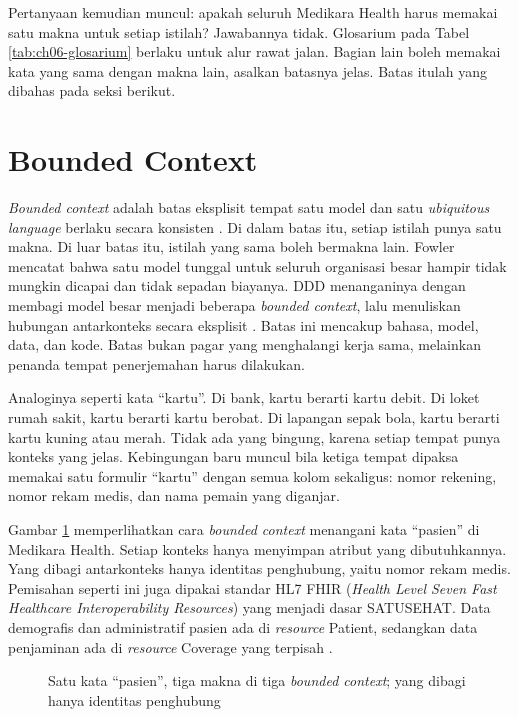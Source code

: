 Pertanyaan kemudian muncul: apakah seluruh Medikara Health harus memakai satu makna untuk setiap
istilah? Jawabannya tidak. Glosarium pada Tabel \ref{tab:ch06-glosarium} berlaku untuk alur rawat
jalan. Bagian lain boleh memakai kata yang sama dengan makna lain, asalkan batasnya jelas. Batas
itulah yang dibahas pada seksi berikut.

\section{Bounded Context}
\label{sec:ch06-bounded-context}

\textit{Bounded context} adalah batas eksplisit tempat satu model dan satu \textit{ubiquitous
language} berlaku secara konsisten \cite{evans2003}. Di dalam batas itu, setiap istilah punya satu
makna. Di luar batas itu, istilah yang sama boleh bermakna lain. Fowler mencatat bahwa satu model
tunggal untuk seluruh organisasi besar hampir tidak mungkin dicapai dan tidak sepadan biayanya. DDD
menanganinya dengan membagi model besar menjadi beberapa \textit{bounded context}, lalu menuliskan
hubungan antarkonteks secara eksplisit \cite{c06-fowler-bc}. Batas ini mencakup bahasa, model,
data, dan kode. Batas bukan pagar yang menghalangi kerja sama, melainkan penanda tempat penerjemahan
harus dilakukan.

Analoginya seperti kata ``kartu''. Di bank, kartu berarti kartu debit. Di loket rumah sakit, kartu
berarti kartu berobat. Di lapangan sepak bola, kartu berarti kartu kuning atau merah. Tidak ada yang
bingung, karena setiap tempat punya konteks yang jelas. Kebingungan baru muncul bila ketiga tempat
dipaksa memakai satu formulir ``kartu'' dengan semua kolom sekaligus: nomor rekening, nomor rekam
medis, dan nama pemain yang diganjar.

Gambar \ref{fig:ch06-makna-pasien} memperlihatkan cara \textit{bounded context} menangani kata
``pasien'' di Medikara Health. Setiap konteks hanya menyimpan atribut yang dibutuhkannya. Yang
dibagi antarkonteks hanya identitas penghubung, yaitu nomor rekam medis. Pemisahan seperti ini juga
dipakai standar HL7 FHIR (\textit{Health Level Seven Fast Healthcare Interoperability Resources})
yang menjadi dasar SATUSEHAT. Data demografis dan administratif pasien ada di \textit{resource}
Patient, sedangkan data penjaminan ada di \textit{resource} Coverage yang terpisah
\cite{fhir-r4-patient}.

\begin{figure}[!htb]
  \centering
  
  \caption{Satu kata ``pasien'', tiga makna di tiga \textit{bounded context};
           yang dibagi hanya identitas penghubung}
  \label{fig:ch06-makna-pasien}
\end{figure}

